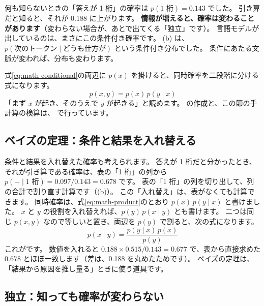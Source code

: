 何も知らないときの「答えが 1 桁」の確率は $p(\text{1 桁})=0.143$ でした。
引き算だと知ると、それが 0.188 に上がります。
\textbf{情報が増えると、確率は変わることがあります}（変わらない場合が、あとで出てくる「独立」です）。
言語モデルが出しているのは、まさにこの条件付き確率です。
(b) は、$p(\text{次のトークン}\mid\text{どうも仕方が})$ という条件付き分布でした。
条件にあたる文脈が変われば、分布も変わります。

式\eqref{eq:math-conditional}の両辺に $p(x)$ を掛けると、同時確率を二段階に分ける式になります。
\begin{equation}
p(x,y)=p(x)\,p(y\mid x)
\label{eq:math-product}
\end{equation}
「まず $x$ が起き、そのうえで $y$ が起きる」と読めます。
の作成と、この節の手計算の検算は、 で行っています。

\subsection*{ベイズの定理：条件と結果を入れ替える}

条件と結果を入れ替えた確率も考えられます。
答えが 1 桁だと分かったとき、それが引き算である確率は、表の「1 桁」の列から $p(-\mid\text{1 桁})=0.097/0.143=0.678$ です。
表の「1 桁」の列を切り出して、列の合計で割り直す計算です（(b)）。%
この「入れ替え」は、表がなくても計算できます。
同時確率は、式\eqref{eq:math-product}のとおり $p(x)\,p(y\mid x)$ と書けました。
$x$ と $y$ の役割を入れ替えれば、$p(y)\,p(x\mid y)$ とも書けます。
二つは同じ $p(x,y)$ なので等しいと置き、両辺を $p(y)$ で割ると、次の式になります。
\begin{equation}
p(x\mid y)=\frac{p(y\mid x)\,p(x)}{p(y)}
\label{eq:math-bayes}
\end{equation}
これがです。
数値を入れると $0.188\times 0.515/0.143=0.677$ で、表から直接求めた 0.678 とほぼ一致します（差は、0.188 を丸めたためです）。
ベイズの定理は、「結果から原因を推し量る」ときに使う道具です。

\subsection*{独立：知っても確率が変わらない}

